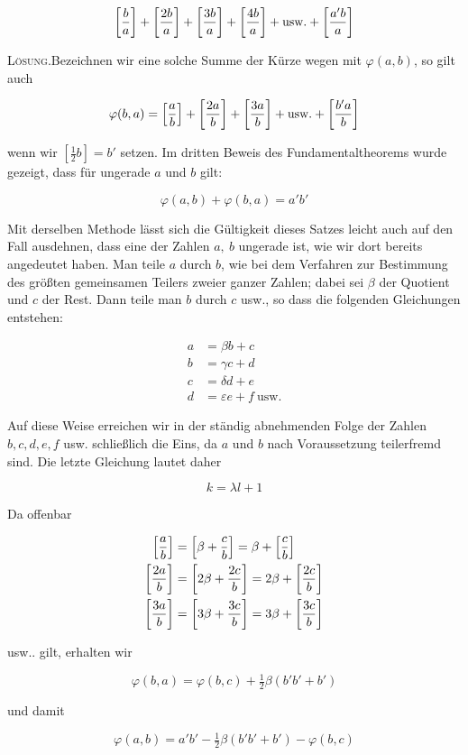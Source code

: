 \[
\left[\frac ba\right]+\left[\frac{2b}a\right]+\left[\frac{3b}a\right]+\left[\frac{4b}a\right]+\text{usw.}+\left[\frac{a'b}a\right]
\]

\textsc{Lösung.}\quad Bezeichnen wir eine solche Summe der Kürze wegen mit $\varphi(a,b)$, so gilt auch

\[
\varphi(b,a)=\left[\frac ab\right]+\left[\frac{2a}b\right]+\left[\frac{3a}b\right]+\text{usw.}+\left[\frac{b'a}b\right]
\]

wenn wir $[\frac12b]=b'$ setzen. Im dritten Beweis des Fundamentaltheorems wurde gezeigt, dass für ungerade $a$ und $b$ gilt:

\[
\varphi(a,b)+\varphi(b,a)=a'b'
\]

Mit derselben Methode lässt sich die Gültigkeit dieses Satzes leicht auch auf den Fall ausdehnen, dass eine der Zahlen $a,\ b$ ungerade ist, wie wir dort bereits angedeutet haben. Man teile $a$ durch $b$, wie bei dem Verfahren zur Bestimmung des größten gemeinsamen Teilers zweier ganzer Zahlen; dabei sei $\beta$ der Quotient und $c$ der Rest. Dann teile man $b$ durch $c$ usw., so dass die folgenden Gleichungen entstehen:

%
\[
\begin{aligned}
a&=\beta b+c\\
b&=\gamma c+d\\
c&=\delta d+e\\
d&=\varepsilon e+f\ \text{usw.}
\end{aligned}
\]

Auf diese Weise erreichen wir in der ständig abnehmenden Folge der Zahlen $b,c,d,e,f$ usw. schließlich die Eins, da $a$ und $b$ nach Voraussetzung teilerfremd sind. Die letzte Gleichung lautet daher

\[
k=\lambda l+1
\]

Da offenbar

\[
\begin{aligned}
\left[\frac ab\right]&=\left[\beta+\frac cb\right]=\beta+\left[\frac cb\right]\\
\left[\frac{2a}b\right]&=\left[2\beta+\frac{2c}b\right]=2\beta+\left[\frac{2c}b\right]\\
\left[\frac{3a}b\right]&=\left[3\beta+\frac{3c}b\right]=3\beta+\left[\frac{3c}b\right]
\end{aligned}
\]

usw.. gilt, erhalten wir

\[
\varphi(b,a)=\varphi(b,c)+\tfrac12\beta(b'b'+b')
\]

und damit

\[
\varphi(a,b)=a'b'-\tfrac12\beta(b'b'+b')-\varphi(b,c)
\]

